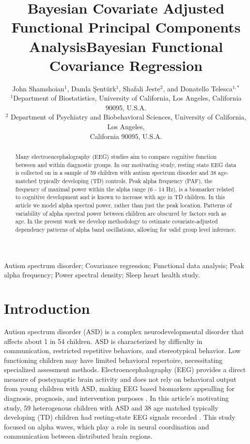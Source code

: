 \documentclass[useAMS,referee,usenatbib]{biom}
\title[This is an Example of Recto Running Head]{Bayesian Covariate Adjusted Functional Principal Components Analysis}
\author{John Shamshoian$^{1}$\email{donatello.telesca@ucla.edu}, Damla {\c S}ent{\"u}rk$^{1}$, Shafali Jeste$^{2}$, and Donatello Telesca$^{1,*}$ \\$^{1}$Department of Biostatistics, University of California, Los Angeles, California 90095, U.S.A.\\$^{2}$ Department of Psychiatry and Biobehavioral Sciences, University of California, Los Angeles,\\ California 90095, U.S.A.}
\title[Bayesian Functional Covariance Regression]{Bayesian Functional Covariance Regression}
\begin{document}
\label{firstpage}


\begin{abstract}
	Many electroencephalography (EEG) studies aim to compare cognitive function between and within diagnostic groups. In our motivating study, resting state EEG data is collected on in a sample of 59 children with autism spectrum disorder and 38 age-matched typically developing (TD) controls. Peak alpha frequency (PAF), the frequency of maximal power within the alpha range (6 - 14 Hz), is a biomarker related to cognitive development and is known to increase with age in TD children. In this article we model alpha spectral power, rather than just the peak location. Patterns of variability of alpha spectral power between children are obscured by factors such as age. In the present work we develop methodology to estimate covariate-adjusted dependency patterns of alpha band oscillations, allowing for valid group level inference.  
\end{abstract}

%

\begin{keywords}
	Autism spectrum disorder; Covariance regression; Functional data analysis; Peak alpha frequency; Power spectral density; Sleep heart health study.
\end{keywords}


\maketitle


\section{Introduction}
\label{s:intro}
Autism spectrum disorder (ASD) is a complex neurodevelopmental disorder that affects about 1 in 54 children. ASD is characterized by difficulty in communication, restricted repetitive behaviors, and stereotypical behavior. Low functioning children may have limited behavioral repertoire, necessitating specialized assessment methods. Electroencephalography (EEG) provides a direct measure of postsynaptic brain activity and does not rely on behavioral output from young children with ASD, making EEG based biomarkers appealling for diagnosis, prognosis, and intervention purposes \citep*{Jeste2015}. In this article's motivating study, 59 heterogenous children with ASD and 38 age matched typically developing (TD) children had resting-state EEG signals recorded \citep*{Dickinson2017}. This study focused on alpha waves, which play a role in neural coordination and communication between distributed brain regions.
\end{document}
